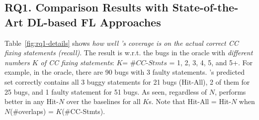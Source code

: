 \subsection{\bf RQ1. Comparison Results with State-of-the-Art DL-based FL Approaches}
\label{sec:rq1-result}



Table~\ref{fig:rq1-details} shows {\em how well {\tool}'s coverage is
on the actual correct CC fixing statements (recall)}.
The result is w.r.t. the bugs in the oracle with {\em different
numbers $K$ of CC fixing statements}: $K$= $\#$$CC$-$Stmts$ = 1, 2, 3, 4,
5, and 5+. For example, in the oracle, there are 90 bugs with 3 faulty
statements. {\tool}'s predicted set correctly contains all 3 buggy
statements for 21 bugs (Hit-All), 2 of them for 25 bugs, and 1 faulty
statement for 51 bugs. As seen, regardless of $N$, {\tool} performs
better in any Hit-$N$ over the baselines for all $K$s. Note that
Hit-All = Hit-$N$ when $N$(\#overlaps) = $K$(\#CC-Stmts).




